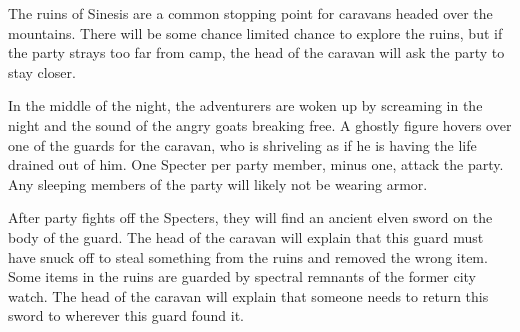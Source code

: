The ruins of Sinesis are a common stopping point for caravans headed over the mountains.
There will be some chance limited chance to explore the ruins, but if the party strays too far from camp, the head of the caravan will ask the party to stay closer.

In the middle of the night, the adventurers are woken up by screaming in the night and the sound of the angry goats breaking free.
A ghostly figure hovers over one of the guards for the caravan, who is shriveling as if he is having the life drained out of him.
One Specter per party member, minus one, attack the party.
Any sleeping members of the party will likely not be wearing armor.

After party fights off the Specters, they will find an ancient elven sword on the body of the guard.
The head of the caravan will explain that this guard must have snuck off to steal something from the ruins and removed the wrong item.
Some items in the ruins are guarded by spectral remnants of the former city watch.
The head of the caravan will explain that someone needs to return this sword to wherever this guard found it.
